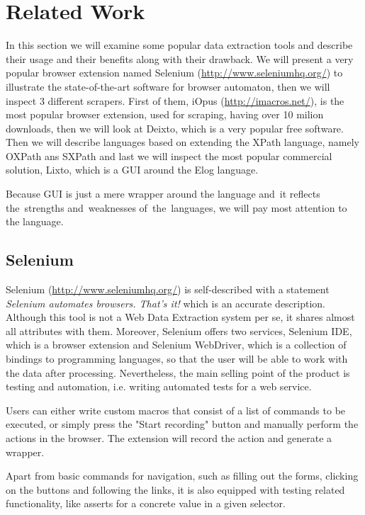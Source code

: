 \chapter{Related Work}
In this section we will examine some popular data extraction tools and describe their usage and their benefits along with their drawback. We will present a very popular browser extension named Selenium (\url{http://www.seleniumhq.org/}) to illustrate the state-of-the-art software for browser automaton, then we will inspect 3 different scrapers. First of them, iOpus (\url{http://imacros.net/}), is the most popular browser extension, used for scraping, having over 10 milion downloads, then we will look at Deixto\cite{kokkoras2013deixto}, which is a very popular free software. Then we will describe languages based on extending the XPath language, namely OXPath ans SXPath  and last we will inspect the most popular commercial solution, Lixto\cite{baumgartner2001visual}, which is a GUI around the Elog language.

Because GUI is just a mere wrapper around the language and~it reflects the~strengths and~weaknesses of~the~languages, we will pay most attention to the language.


\section{Selenium}
Selenium (\url{http://www.seleniumhq.org/}) is self-described with a statement \textit{Selenium automates browsers. That's it!} which is an accurate description. Although this tool is not a Web Data Extraction system per se, it shares almost all attributes with them. Moreover, Selenium offers two services, Selenium IDE, which is a browser extension and Selenium WebDriver, which is a collection of bindings to programming languages, so that the user will be able to work with the data after processing.
Nevertheless, the main selling point of the product is testing and automation, i.e. writing automated tests for a web service.

Users can either write custom macros that consist of a list of commands to be executed, or simply press the "Start recording" button and manually perform the actions in the browser. The extension will record the action and generate a wrapper.

Apart from basic commands for navigation, such as filling out the forms, clicking on the buttons and following the links, it is also equipped with testing related functionality, like asserts for a concrete value in a given selector.

